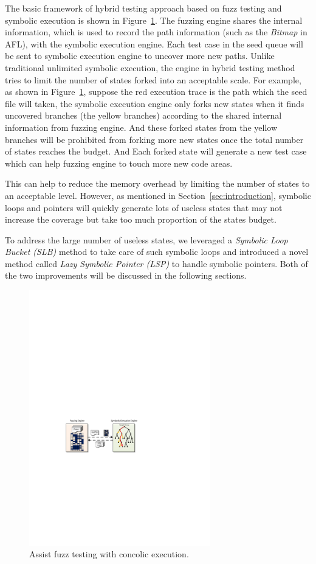 The basic framework of hybrid testing approach based on fuzz testing and symbolic execution is shown in Figure~\ref{s2e-assist}. The fuzzing engine shares the internal information, which is used to record the path information (such as the \textit{Bitmap} in AFL), with the symbolic execution engine. 
Each test case in the seed queue will be sent to symbolic execution engine to uncover more new paths. 
Unlike traditional unlimited symbolic execution, the engine in hybrid testing method tries to limit the number of states forked into an acceptable scale. For example, as shown in Figure~\ref{s2e-assist}, suppose the red execution trace is the path which the seed file will taken, the symbolic execution engine only forks new states when it finds uncovered branches (the yellow branches) according to the shared internal information from fuzzing engine. And these forked states from the yellow branches will be prohibited from forking more new states once the total number of states reaches the budget. And Each forked state will generate a new test case which can help fuzzing engine to touch more new code areas. 

This can help to reduce the memory overhead by limiting the number of states to an acceptable level. However, as mentioned in Section~\ref{sec:introduction}, symbolic loops and pointers will quickly generate lots of useless states that may not increase the coverage but take too much proportion of the states budget.

To address the large number of useless states, we leveraged a \textit{Symbolic Loop Bucket (SLB)} method to take care of such symbolic loops and introduced a novel method called \textit{Lazy Symbolic Pointer (LSP)} to handle symbolic pointers. Both of the two improvements will be discussed in the following sections.

\begin{figure}
\centering
\includegraphics[width=0.7\textwidth]{figures/s2e-assist.pdf} 
\caption{Assist fuzz testing with concolic execution.}\label{s2e-assist}
\end{figure}

